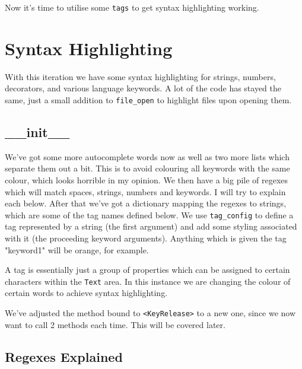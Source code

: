 \documentclass[a4paper,11pt,openany]{book}
\begin{document}
Now it's time to utilise some \lstinline[columns=fixed]{tags} to get syntax highlighting working. 

\newpage

\section{Syntax Highlighting}
With this iteration we have some syntax highlighting for strings, numbers, decorators, and various language keywords. A lot of the code has stayed the same, just a small addition to \lstinline[columns=fixed]{file_open} to highlight files upon opening them. 



\subsection{\_\_init\_\_}

We've got some more autocomplete words now as well as two more lists which separate them out a bit. This is to avoid colouring all keywords with the same colour, which looks horrible in my opinion. We then have a big pile of regexes which will match spaces, strings, numbers and keywords. I will try to explain each below. After that we've got a dictionary mapping the regexes to strings, which are some of the tag names defined below. We use \lstinline[columns=fixed]{tag_config} to define a tag represented by a string (the first argument) and add some styling associated with it (the proceeding keyword arguments). Anything which is given the tag "keyword1" will be orange, for example. 

\vspace{5mm}

A tag is essentially just a group of properties which can be assigned to certain characters within the \lstinline[columns=fixed]{Text} area. In this instance we are changing the colour of certain words to achieve syntax highlighting.

\vspace{5mm}

We've adjusted the method bound to \lstinline[columns=fixed]{<KeyRelease>} to a new one, since we now want to call 2 methods each time. This will be covered later. 

\subsection{Regexes Explained}
\end{document}
